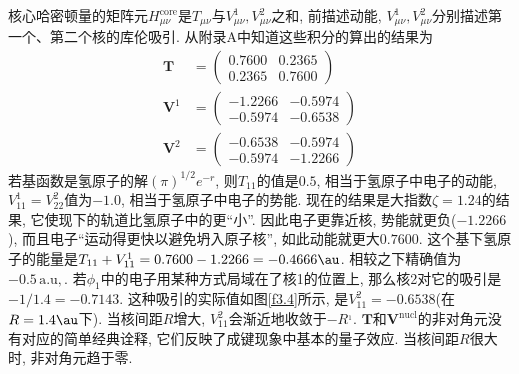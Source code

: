 核心哈密顿量的矩阵元$H_{\mu\nu}^\mathrm{core}$是$T_{\mu\nu}$与$V_{\mu\nu}^1,V_{\mu\nu}^2$之和, 前描述动能, $V_{\mu\nu}^1,V_{\mu\nu}^2$分别描述第一个、第二个核的库伦吸引. 从附录A中知道这些积分的算出的结果为
\begin{align}
\mathbf{T} & = 
\begin{pmatrix}
0.7600&0.2365\\0.2365&0.7600
\end{pmatrix}\\
\mathbf{V}^1 & = 
\begin{pmatrix}
-1.2266&-0.5974\\-0.5974&-0.6538
\end{pmatrix}\\
\mathbf{V}^2 & = 
\begin{pmatrix}
-0.6538&-0.5974\\-0.5974&-1.2266
\end{pmatrix}
\end{align}
若基函数是氢原子的解$(\pi)^{1/2}e^{-r}$, 则$T_{11}$的值是$0.5$, 相当于氢原子中电子的动能, $V_{11}^1=V_{22}^2$值为$-1.0$, 相当于氢原子中电子的势能. 现在的结果是大指数$\zeta=1.24$的结果, 它使现下的轨道比氢原子中的更``小”. 因此电子更靠近核, 势能就更负($-1.2266$), 而且电子``运动得更快以避免坍入原子核”, 如此动能就更大$0.7600$. 这个基下氢原子的能量是$T_{11}+V_{11}^1=0.7600-1.2266=-0.4666\au$. 相较之下精确值为$-0.5\,\mathrm{a.u,}$. 若$\phi_1$中的电子用某种方式局域在了核1的位置上, 那么核2对它的吸引是$-1/1.4=-0.7143$. 这种吸引的实际值如图\ref{f3.4}所示, 是$V_{11}^2=-0.6538$(在$R=1.4\au$下). 当核间距$R$增大, $V_{11}^2$会渐近地收敛于$-R^{_1}$. $\mathbf{T}$和$\mathbf{V}^\mathrm{nucl}$的非对角元没有对应的简单经典诠释, 它们反映了成键现象中基本的量子效应. 当核间距$R$很大时, 非对角元趋于零.

